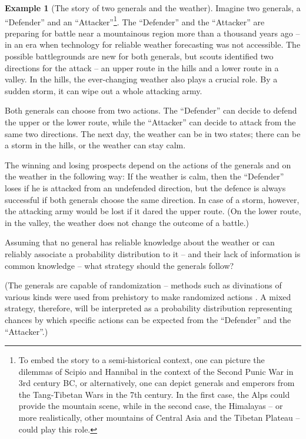 \documentclass{article}
\theoremstyle{definition}
\newtheorem*{example}{Example}
\begin{document}
\begin{example}[The story of two generals and the weather]
\label{story:GW}
Imagine two generals, a ``Defender'' and an ``Attacker''\footnote{To embed the story to a semi-historical context, one can picture the dilemmas of Scipio and Hannibal in the context of the Second Punic War in 3rd century BC, or alternatively, one can depict generals and emperors from the Tang-Tibetan Wars in the 7th century. In the first case, the Alps could provide the mountain scene, while in the second case, the Himalayas -- or more realistically, other mountains of Central Asia and the Tibetan Plateau -- could play this role.}. The ``Defender'' and the ``Attacker'' are preparing for battle 
near a mountainous region more than a thousand years ago -- in an era when technology for reliable weather forecasting was not accessible.
The possible battlegrounds are new for both generals, but scouts identified two directions for the attack -- an upper route in the hills and a lower route in a valley.
In the hills, the ever-changing weather also plays a crucial role. By a sudden storm, it can wipe out a whole attacking army.

Both generals can choose from two actions. The ``Defender'' can decide to defend the upper or the lower route, while the ``Attacker'' can decide to attack from the same two directions. The next day, the weather can be in two states; there can be a storm in the hills, or the weather can stay calm.

The winning and losing prospects depend on the actions of the generals and on the weather in the following way:
If the weather is calm, then the ``Defender'' loses if he is attacked from an undefended direction, but the defence is always successful if both generals choose the same direction.
In case of a storm, however, the attacking army would be lost if it dared the upper route.
(On the lower route, in the valley, the weather does not change the outcome of a battle.)

Assuming that no general has reliable knowledge about the weather or can reliably associate a probability distribution to it -- and their lack of information is common knowledge -- what strategy should the generals follow?

(The generals are capable of randomization -- methods such as divinations of various kinds were used from prehistory to make randomized actions \cite{paper:DivinationArticle}. A mixed strategy, therefore, will be interpreted as a probability distribution representing chances by which specific actions can be expected from the ``Defender'' and the ``Attacker''.)

\end{example}
\end{document}

